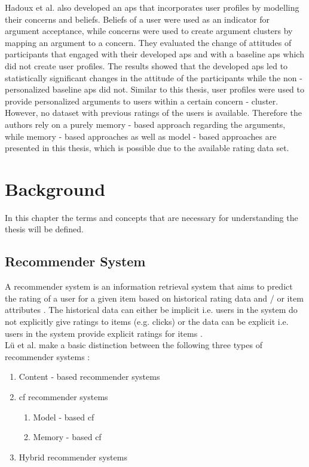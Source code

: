 Hadoux et al. \cite{hadoux2021strategic} also developed an \acrshort{aps} that incorporates user profiles by modelling their concerns and beliefs. Beliefs of a user were used as an indicator for argument acceptance, while concerns were used to create argument clusters by mapping an argument to a concern. They evaluated the change of attitudes of participants that engaged with their developed \acrshort{aps} and with a baseline \acrshort{aps} which did not create user profiles. The results showed that the developed \acrshort{aps} led to statistically significant changes in the attitude of the participants while the non - personalized baseline \acrshort{aps} did not. Similar to this thesis, user profiles were used to provide personalized arguments to users within a certain concern - cluster. However, no dataset with previous ratings of the users is available. Therefore the authors rely on a purely memory - based \cite{aggarwal2016recommender} approach regarding the arguments, while memory - based approaches as well as model - based \cite{aggarwal2016recommender} approaches are presented in this thesis, which is possible due to the available rating data set.

\section{Background}
\label{sec:background}
In this chapter the terms and concepts that are necessary for understanding the thesis will be defined. 

\subsection{Recommender System}
\label{subsec:rec_sys}
A recommender system is an information retrieval system that aims to predict the rating of a user for a given item based on historical rating data and / or item attributes \cite{aggarwal2016recommender}.
The historical data can either be implicit i.e. users in the system do not explicitly give ratings to items (e.g. clicks) or the data
can be explicit i.e. users in the system provide explicit ratings for items \cite{beel2016paper}.\\
Lü et al. \cite{lu2012recommender} make a basic distinction between the following three types of recommender systems :
\begin{enumerate}
    \item Content - based recommender systems 
    \item \acrfull{cf} recommender systems
    \begin{enumerate}
        \item Model - based \acrshort{cf}
        \item Memory - based \acrshort{cf}
    \end{enumerate}
    \item Hybrid recommender systems
\end{enumerate}

